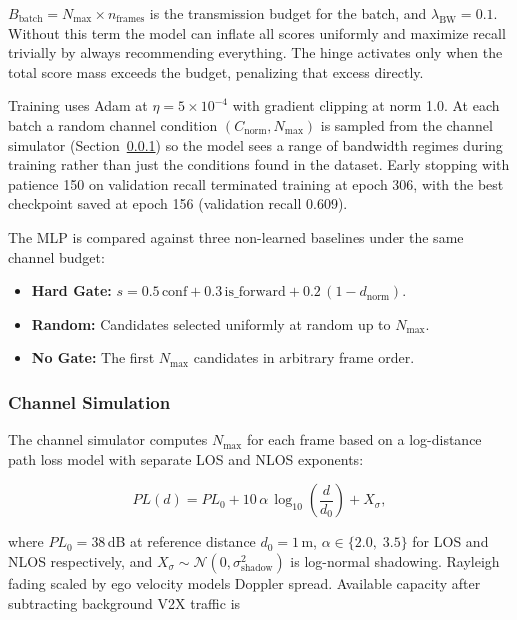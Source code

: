\documentclass[12pt]{article}
\begin{document}
\noindent $B_{\text{batch}} = N_{\max} \times n_{\text{frames}}$ is the transmission budget for the batch, and $\lambda_{\text{BW}} = 0.1$. Without this term the model can inflate all scores uniformly and maximize recall trivially by always recommending everything. The hinge activates only when the total score mass exceeds the budget, penalizing that excess directly.

\medskip
Training uses Adam at $\eta = 5\times10^{-4}$ with gradient clipping at norm 1.0. At each batch a random channel condition $(C_{\text{norm}}, N_{\max})$ is sampled from the channel simulator (Section~\ref{sec:channel}) so the model sees a range of bandwidth regimes during training rather than just the conditions found in the dataset. Early stopping with patience 150 on validation recall terminated training at epoch 306, with the best checkpoint saved at epoch 156 (validation recall 0.609).

\medskip
The MLP is compared against three non-learned baselines under the same channel budget:
\begin{itemize}[noitemsep]
    \item \textbf{Hard Gate:} $s = 0.5\,\text{conf} + 0.3\,\text{is\_forward} + 0.2\,(1-d_{\text{norm}})$.
    \item \textbf{Random:} Candidates selected uniformly at random up to $N_{\max}$.
    \item \textbf{No Gate:} The first $N_{\max}$ candidates in arbitrary frame order.
\end{itemize}

\subsubsection{Channel Simulation}
\label{sec:channel}

The channel simulator computes $N_{\max}$ for each frame based on a log-distance path loss model with separate LOS and NLOS exponents:

\begin{equation}
    PL(d) = PL_0 + 10\,\alpha\,\log_{10}\!\left(\frac{d}{d_0}\right) + X_\sigma,
\end{equation}

\noindent where $PL_0 = 38$\,dB at reference distance $d_0 = 1$\,m, $\alpha \in \{2.0,\;3.5\}$ for LOS and NLOS respectively, and $X_\sigma \sim \mathcal{N}(0,\sigma_{\text{shadow}}^2)$ is log-normal shadowing. Rayleigh fading scaled by ego velocity models Doppler spread. Available capacity after subtracting background V2X traffic is
\end{document}
